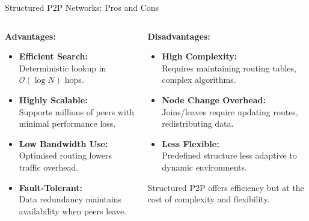 \documentclass[aspectratio=169, table]{beamer}
\begin{document}
\begin{frame}{Structured P2P Networks: Pros and Cons}
	\vspace{20pt}
	\begin{columns}[t]
		
		\begin{column}{0.5\textwidth}
			\textbf{Advantages:}
			\begin{itemize}
				\item \textbf{Efficient Search:} \\
				Deterministic lookup in \(\mathcal{O}(\log N)\) hops.
				
				\item \textbf{Highly Scalable:} \\
				Supports millions of peers with minimal performance loss.
				
				\item \textbf{Low Bandwidth Use:} \\
				Optimised routing lowers traffic overhead.
				
				\item \textbf{Fault-Tolerant:} \\
				Data redundancy maintains availability when peers leave.
			\end{itemize}
		\end{column}
		
		\begin{column}{0.5\textwidth}
			\textbf{Disadvantages:}
			\begin{itemize}
				\item \textbf{High Complexity:} \\
				Requires maintaining routing tables, complex algorithms.
				
				\item \textbf{Node Change Overhead:} \\
				Joins/leaves require updating routes, redistributing data.
				
				\item \textbf{Less Flexible:} \\
				Predefined structure less adaptive to dynamic environments.
			\end{itemize}
			
			\vspace{10pt}
			Structured P2P offers efficiency but at the cost of complexity and flexibility.
		\end{column}
		
	\end{columns}
\end{frame}
\end{document}
